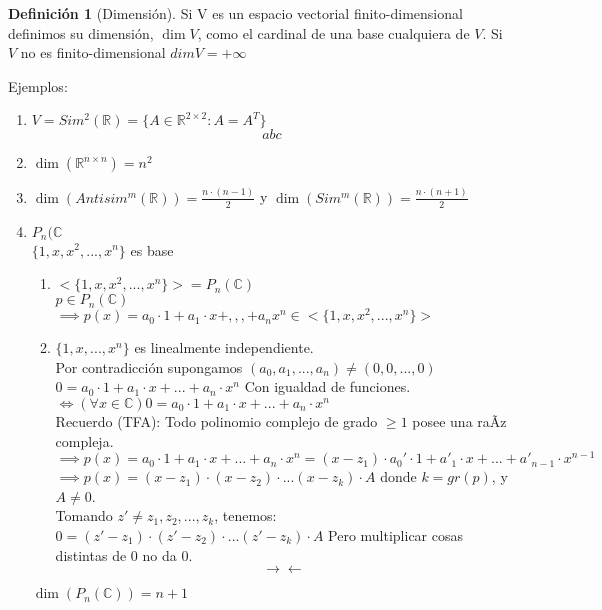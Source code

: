 \documentclass[11pt]{book}
\theoremstyle{definition}
\newtheorem{defn}{Definición}[section]
\begin{document}
\begin{defn}[Dimensión]
	Si V es un espacio vectorial finito-dimensional definimos su dimensión, $\dim V$, como el cardinal de una base cualquiera de $V$. Si $V$ no es finito-dimensional $dimV=+\infty$
\end{defn}
Ejemplos:
\begin{enumerate}
	\item $V=Sim^2(\mathbb{R})=\{A\in\mathbb{R}^{2\times 2}:A=A^T\}$
	      \[
		      abc
	      \]

	\item $\dim(\mathbb{R}^{n\times n})=n^2$

	\item $\dim(Antisim^m(\mathbb{R}))=\frac{n\cdot(n-1)}{2}$ y $\dim(Sim^m(\mathbb{R}))=\frac{n\cdot (n+1)}{2}$

	\item$P_n(\mathbb{C}$\\
	      $\{1,x,x^2,...,x^n\}$ es base
	      \begin{enumerate}
		      \item $<\{1,x,x^2,...,x^n\}>=P_n(\mathbb{C})$\\
		            $p\in P_n(\mathbb{C})$\\
		            $\implies p(x)=a_0\cdot 1+a_1\cdot x+,,,+a_nx^n\in<\{1,x,x^2,...,x^n\}>$

		      \item $\{1,x,...,x^n\}$ es linealmente independiente.\\
		            Por contradicción supongamos $(a_0,a_1,...,a_n)\neq (0,0,...,0)$\\
		            $0=a_0\cdot 1+a_1\cdot x+...+a_n\cdot x^n$ Con igualdad de funciones.\\
		            $\iff (\forall x\in \mathbb{C}) 0=a_0\cdot 1+a_1\cdot x+...+a_n\cdot x^n$\\
		            Recuerdo (TFA): Todo polinomio complejo de grado $\geq 1$ posee una raÃ­z compleja.\\
		            $\implies p(x)=a_0\cdot 1+a_1\cdot x+...+a_n\cdot x^n=(x-z_1)\cdot a_0'\cdot 1+a'_1\cdot x+...+a'_{n-1}\cdot x^{n-1}$\\
		            $\implies p(x)=(x-z_1)\cdot (x-z_2)\cdot...(x-z_k)\cdot A$ donde $k=gr(p)$, y $A\neq 0$.\\
		            Tomando $z'\neq z_1,z_2,...,z_k$, tenemos: $0=(z'-z_1)\cdot (z'-z_2)\cdot...(z'-z_k)\cdot A$ Pero multiplicar cosas distintas de $0$ no da $0$.
		            \[
			            \rightarrow\leftarrow
		            \]
	      \end{enumerate}
	      $\dim(P_n(\mathbb{C}))=n+1$
\end{enumerate}
\end{document}
